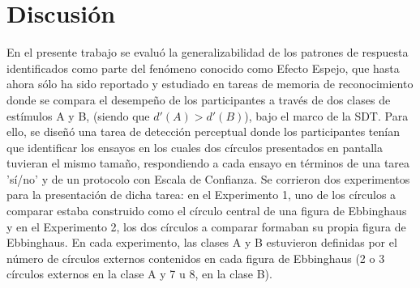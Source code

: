 
\chapter{Discusión} %

\label{Cap_Disc} %

En el presente trabajo se evaluó la generalizabilidad de los patrones de respuesta identificados como parte del fenómeno conocido como Efecto Espejo, que hasta ahora sólo ha sido reportado y estudiado en tareas de memoria de reconocimiento donde se compara el desempeño de los participantes a través de dos clases de estímulos A y B, (siendo que $d'(A)>d'(B)$), bajo el marco de la SDT. Para ello, se diseñó una tarea de detección perceptual donde los participantes tenían que identificar los ensayos en los cuales dos círculos presentados en pantalla tuvieran el mismo tamaño, respondiendo a cada ensayo en términos de una tarea 'sí/no' y de un protocolo con Escala de Confianza. Se corrieron dos experimentos para la presentación de dicha tarea: en el Experimento 1, uno de los círculos a comparar estaba construido como el círculo central de una figura de Ebbinghaus y en el Experimento 2, los dos círculos a comparar formaban su propia figura de Ebbinghaus. En cada experimento, las clases A y B estuvieron definidas por el número de círculos externos contenidos en cada figura de Ebbinghaus (2 o 3 círculos externos en la clase A y 7 u 8, en la clase B).\\


